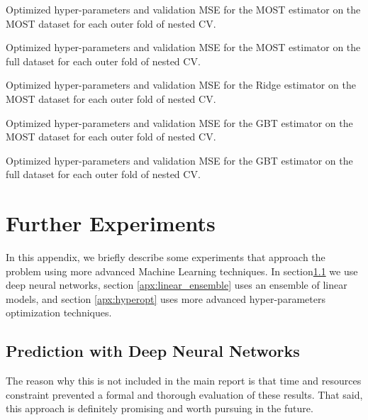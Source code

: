 \documentclass[a4paper,11pt]{kth-mag}
\begin{document}
\begin{table}
\caption{Optimized hyper-parameters and validation MSE for the MOST estimator on the MOST dataset for each outer fold of nested CV.}
\label{tbl:params_most_most}

\end{table}

\begin{table}
\caption{Optimized hyper-parameters and validation MSE for the MOST estimator on the full dataset for each outer fold of nested CV.}
\label{tbl:params_most_full}

\end{table}


\begin{table}
\caption{Optimized hyper-parameters and validation MSE for the Ridge estimator on the MOST dataset for each outer fold of nested CV.}
\label{tbl:params_ridge_most}

\end{table}


\begin{table}
\caption{Optimized hyper-parameters and validation MSE for the GBT estimator on the MOST dataset for each outer fold of nested CV.}
\label{tbl:params_gbt_most}

\end{table}

\begin{table}
\caption{Optimized hyper-parameters and validation MSE for the GBT estimator on the full dataset for each outer fold of nested CV.}
\label{tbl:params_gbt_full}

\end{table}


\chapter{Further Experiments}
\label{apx:moar}
In this appendix, we briefly describe some experiments that approach the problem using more advanced Machine Learning techniques. In section\ref{apx:deep_learning} we use deep neural networks, section \ref{apx:linear_ensemble} uses an ensemble of linear models, and section \ref{apx:hyperopt} uses more advanced hyper-parameters optimization techniques.

\section{Prediction with Deep Neural Networks}
\label{apx:deep_learning}
The reason why this is not included in the main report is that time and resources constraint prevented a formal and thorough evaluation of these results. That said, this approach is definitely promising and worth pursuing in the future.
\end{document}

